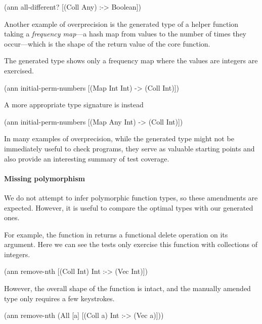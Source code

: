 \begin{cljlisting}
(ann all-different? [(Coll Any) :-> Boolean])
\end{cljlisting}

Another example of overprecision is the generated type
of  a helper function
taking a \emph{frequency map}---a hash map from values
to the number of times they occur---which is the shape
of the return value of the core 
function.

The generated type shows only a frequency map where
the values are integers are exercised.

\begin{cljlisting}
(ann initial-perm-numbers
  [(Map Int Int) -> (Coll Int)])
\end{cljlisting}

A more appropriate type signature is instead

\begin{cljlisting}
(ann initial-perm-numbers
  [(Map Any Int) -> (Coll Int)])
\end{cljlisting}

In many examples of overprecision, while the generated
type might not be immediately useful to check programs,
they serve as valuable starting points and also provide
an interesting summary of test coverage.

\paragraph{Missing polymorphism}

We do not attempt to infer polymorphic function types, 
so these amendments are expected. However, it is useful
to compare the optimal types with our generated ones.

For example, the  function in 
returns a functional delete operation on its argument.
Here we can see the tests only exercise this function with
collections of integers.

\begin{cljlisting}
(ann remove-nth [(Coll Int) Int :-> (Vec Int)])
\end{cljlisting}

However, the overall shape of the function is intact,
and the manually amended type only requires a few 
keystrokes.

\begin{cljlisting}
(ann remove-nth
  (All [a] [(Coll a) Int :-> (Vec a)]))
\end{cljlisting}

